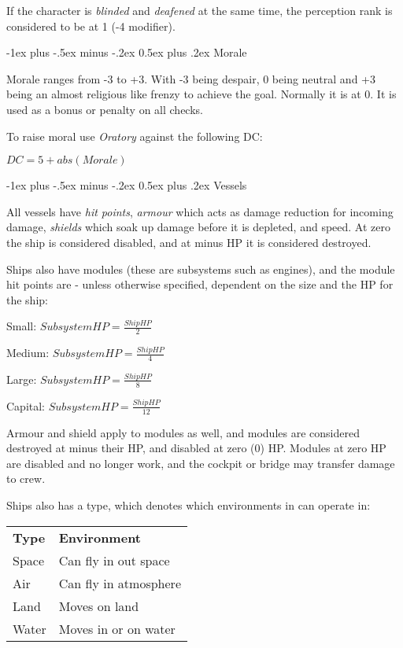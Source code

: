 \documentclass[8pt,landscape,a4paper]{article}
\makeatletter
\renewcommand{\section}{\@startsection{section}{1}{0mm}%
                                {-1ex plus -.5ex minus -.2ex}%
                                {0.5ex plus .2ex}%
                                {\normalfont\large\bfseries}}
\makeatother
\begin{document}
\begin{multicols}{4}
If the character is \emph{blinded} and \emph{deafened} at the same time, the
perception rank is considered to be at 1 (-4 modifier).

\section{Morale}

Morale ranges from -3 to +3. With -3 being despair, 0 being neutral and
+3 being an almost religious like frenzy to achieve the goal. Normally it is
at 0. It is used as a bonus or penalty on all checks.

To raise moral use \emph{Oratory} against the following DC:

\(DC = 5 + abs(Morale)\)

\newpage

\section{Vessels}

All vessels have \emph{hit points}, \emph{armour} which acts as damage
reduction for incoming damage, \emph{shields} which soak up damage before
it is depleted, and speed. At zero the ship is considered disabled, and at
minus HP it is considered destroyed.

Ships also have modules (these are subsystems such as engines), and the
module hit points are - unless otherwise specified, dependent on the size
and the HP for the ship:

Small: \(SubsystemHP = \frac{ShipHP}{2} \)

Medium: \(SubsystemHP = \frac{ShipHP}{4} \)

Large: \(SubsystemHP = \frac{ShipHP}{8} \)

Capital: \(SubsystemHP = \frac{ShipHP}{12} \)

Armour and shield apply to modules as well, and modules are considered destroyed
at minus their HP, and disabled at zero (0) HP. Modules at zero HP are disabled
and no longer work, and the cockpit or bridge may transfer damage to crew.

Ships also has a type, which denotes which environments in can operate in:

\begin{center}
\begin{tabular}{ll}
\textbf{Type}  & \textbf{Environment} \\
Space & Can fly in out space  \\
Air   & Can fly in atmosphere \\
Land  & Moves on land         \\
Water & Moves in or on water
\end{tabular}
\end{center}


\end{multicols}
\end{document}
